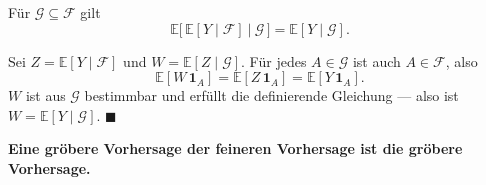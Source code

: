 \begin{merksatz}
Für $\mathcal G \subseteq \mathcal F$ gilt
\[ \mathbb{E}\bigl[\,\mathbb{E}[Y \mid \mathcal F] \ \big|\ \mathcal G\,\bigr] = \mathbb{E}[Y \mid \mathcal G] . \]

Sei $Z = \mathbb{E}[Y\mid\mathcal F]$ und $W = \mathbb{E}[Z\mid\mathcal G]$. Für jedes $A \in \mathcal G$ ist auch $A \in \mathcal F$, also
\[ \mathbb{E}[W\,\mathbf 1_A] = \mathbb{E}[Z\,\mathbf 1_A] = \mathbb{E}[Y\,\mathbf 1_A] . \]
$W$ ist aus $\mathcal G$ bestimmbar und erfüllt die definierende Gleichung --- also ist $W = \mathbb{E}[Y\mid\mathcal G]$. $\blacksquare$

\begin{center}
\begin{minipage}{0.9\textwidth}
\textbf{Eine gröbere Vorhersage der feineren Vorhersage ist die gröbere Vorhersage.}
\end{minipage}
\end{center}

\begin{center}
\begin{minipage}{0.88\textwidth}
\end{minipage}
\end{center}
\end{merksatz}

